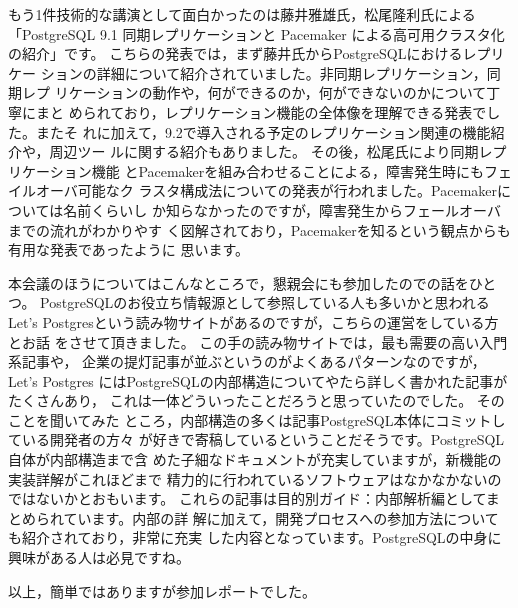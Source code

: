 もう1件技術的な講演として面白かったのは藤井雅雄氏，松尾隆利氏による
「PostgreSQL 9.1 同期レプリケーションと Pacemaker による高可用クラスタ化
の紹介」です。 こちらの発表では，まず藤井氏からPostgreSQLにおけるレプリケー
ションの詳細について紹介されていました。非同期レプリケーション，同期レプ
リケーションの動作や，何ができるのか，何ができないのかについて丁寧にまと
められており，レプリケーション機能の全体像を理解できる発表でした。またそ
れに加えて，9.2で導入される予定のレプリケーション関連の機能紹介や，周辺ツー
ルに関する紹介もありました。 その後，松尾氏により同期レプリケーション機能
とPacemakerを組み合わせることによる，障害発生時にもフェイルオーバ可能なク
ラスタ構成法についての発表が行われました。Pacemakerについては名前くらいし
か知らなかったのですが，障害発生からフェールオーバまでの流れがわかりやす
く図解されており，Pacemakerを知るという観点からも有用な発表であったように
思います。

本会議のほうについてはこんなところで，懇親会にも参加したのでの話をひとつ。
PostgreSQLのお役立ち情報源として参照している人も多いかと思われるLet's
Postgresという読み物サイトがあるのですが，こちらの運営をしている方とお話
をさせて頂きました。 この手の読み物サイトでは，最も需要の高い入門系記事や，
企業の提灯記事が並ぶというのがよくあるパターンなのですが，Let's Postgres
にはPostgreSQLの内部構造についてやたら詳しく書かれた記事がたくさんあり，
これは一体どういったことだろうと思っていたのでした。 そのことを聞いてみた
ところ，内部構造の多くは記事PostgreSQL本体にコミットしている開発者の方々
が好きで寄稿しているということだそうです。PostgreSQL自体が内部構造まで含
めた子細なドキュメントが充実していますが，新機能の実装詳解がこれほどまで
精力的に行われているソフトウェアはなかなかないのではないかとおもいます。
これらの記事は目的別ガイド：内部解析編としてまとめられています。内部の詳
解に加えて，開発プロセスへの参加方法についても紹介されており，非常に充実
した内容となっています。PostgreSQLの中身に興味がある人は必見ですね。

以上，簡単ではありますが参加レポートでした。

